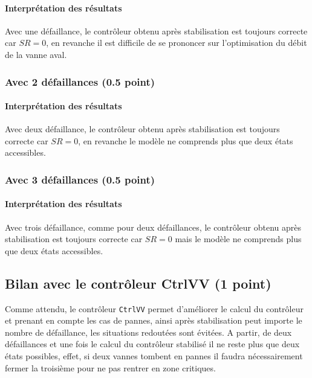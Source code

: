 \documentclass[a4paper]{book}
\begin{document}
\paragraph{Interprétation des résultats}

Avec une défaillance, le contrôleur obtenu après stabilisation est toujours
correcte car $SR = 0$, en revanche il est difficile de se prononcer sur
l'optimisation du débit de la vanne aval.

\subsubsection{Avec 2 défaillances (0.5 point)}

\paragraph{Interprétation des résultats}

Avec deux défaillance, le contrôleur obtenu après stabilisation est toujours
correcte car $SR = 0$, en revanche le modèle ne comprends plus que deux états
accessibles.

\subsubsection{Avec 3 défaillances (0.5 point)}

\paragraph{Interprétation des résultats}

Avec trois défaillance, comme pour deux défaillances, le contrôleur obtenu
après stabilisation est toujours correcte car $SR = 0$ mais le modèle ne
comprends plus que deux états accessibles.

\subsection{Bilan avec le contrôleur CtrlVV (1 point)}

Comme attendu, le contrôleur \texttt{CtrlVV} permet d'améliorer le calcul
du contrôleur et prenant en compte les cas de pannes, ainsi après stabilisation
peut importe le nombre de défaillance, les situations redoutées sont évitées. A
partir, de deux défaillances et une fois le calcul du contrôleur stabilisé il
ne reste plus que deux états possibles, effet, si deux vannes tombent en pannes
il faudra nécessairement fermer la troisième pour ne pas rentrer en zone
critiques.
\end{document}
